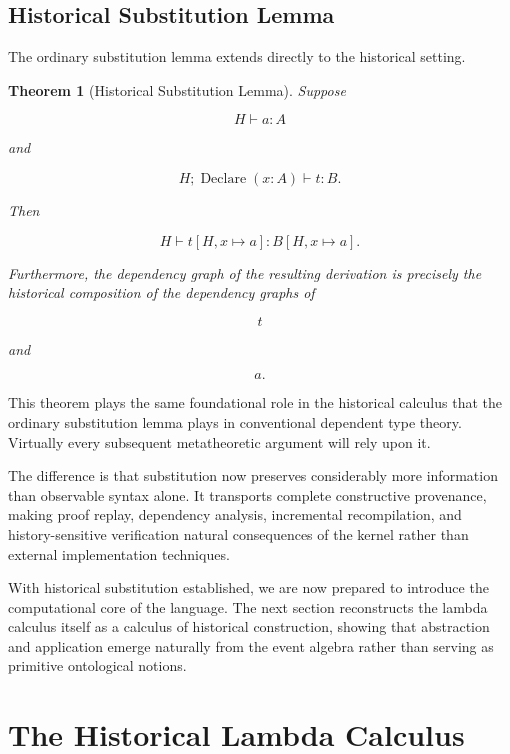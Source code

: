 \documentclass[12pt,oneside]{article}
\newtheorem{theorem}{Theorem}[section]
\theoremstyle{definition}
\theoremstyle{remark}
\begin{document}
\subsection{Historical Substitution Lemma}

The ordinary substitution lemma extends directly to the historical setting.

\begin{theorem}[Historical Substitution Lemma]

Suppose

\[
H
\vdash
a:A
\]

and

\[
H;
\operatorname{Declare}(x:A)
\vdash
t:B.
\]

Then

\[
H
\vdash
t[H,x\mapsto a]
:
B[H,x\mapsto a].
\]

Furthermore, the dependency graph of the resulting derivation is precisely the
historical composition of the dependency graphs of

\[
t
\]

and

\[
a.
\]

\end{theorem}

This theorem plays the same foundational role in the historical calculus that
the ordinary substitution lemma plays in conventional dependent type theory.
Virtually every subsequent metatheoretic argument will rely upon it.

The difference is that substitution now preserves considerably more information
than observable syntax alone. It transports complete constructive provenance,
making proof replay, dependency analysis, incremental recompilation, and
history-sensitive verification natural consequences of the kernel rather than
external implementation techniques.

With historical substitution established, we are now prepared to introduce the
computational core of the language. The next section reconstructs the lambda
calculus itself as a calculus of historical construction, showing that
abstraction and application emerge naturally from the event algebra rather than
serving as primitive ontological notions.

\section{The Historical Lambda Calculus}
\end{document}
